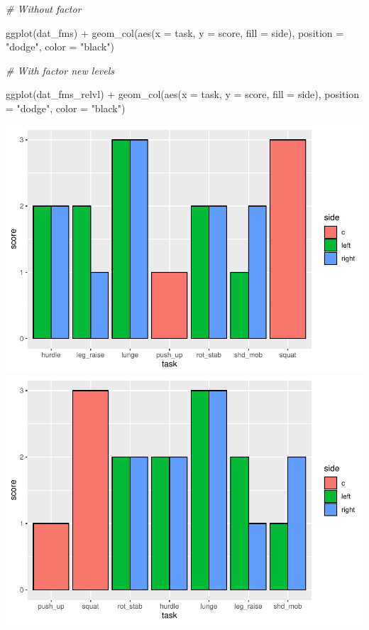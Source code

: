 \documentclass[
]{book}
\newenvironment{Shaded}{\begin{snugshade}}{\end{snugshade}}
\newcommand{\AttributeTok}[1]{\textcolor[rgb]{0.77,0.63,0.00}{#1}}
\newcommand{\CommentTok}[1]{\textcolor[rgb]{0.56,0.35,0.01}{\textit{#1}}}
\newcommand{\FunctionTok}[1]{\textcolor[rgb]{0.00,0.00,0.00}{#1}}
\newcommand{\NormalTok}[1]{#1}
\newcommand{\SpecialCharTok}[1]{\textcolor[rgb]{0.00,0.00,0.00}{#1}}
\newcommand{\StringTok}[1]{\textcolor[rgb]{0.31,0.60,0.02}{#1}}
\begin{document}
\begin{Shaded}
\begin{Highlighting}[]
\CommentTok{\# Without factor }

\FunctionTok{ggplot}\NormalTok{(dat\_fms) }\SpecialCharTok{+}
  \FunctionTok{geom\_col}\NormalTok{(}\FunctionTok{aes}\NormalTok{(}\AttributeTok{x =}\NormalTok{ task, }\AttributeTok{y =}\NormalTok{ score, }\AttributeTok{fill =}\NormalTok{ side), }\AttributeTok{position =} \StringTok{"dodge"}\NormalTok{, }\AttributeTok{color =} \StringTok{"black"}\NormalTok{) }

\CommentTok{\# With factor new levels}

\FunctionTok{ggplot}\NormalTok{(dat\_fms\_relvl) }\SpecialCharTok{+}
  \FunctionTok{geom\_col}\NormalTok{(}\FunctionTok{aes}\NormalTok{(}\AttributeTok{x =}\NormalTok{ task, }\AttributeTok{y =}\NormalTok{ score, }\AttributeTok{fill =}\NormalTok{ side), }\AttributeTok{position =} \StringTok{"dodge"}\NormalTok{, }\AttributeTok{color =} \StringTok{"black"}\NormalTok{) }
\end{Highlighting}
\end{Shaded}

\includegraphics{se201_stats_book_files/figure-latex/FIG-BAR-GRAPH-FACTOR-EFFECTS-1.pdf} \includegraphics{se201_stats_book_files/figure-latex/FIG-BAR-GRAPH-FACTOR-EFFECTS-2.pdf}
\end{document}
